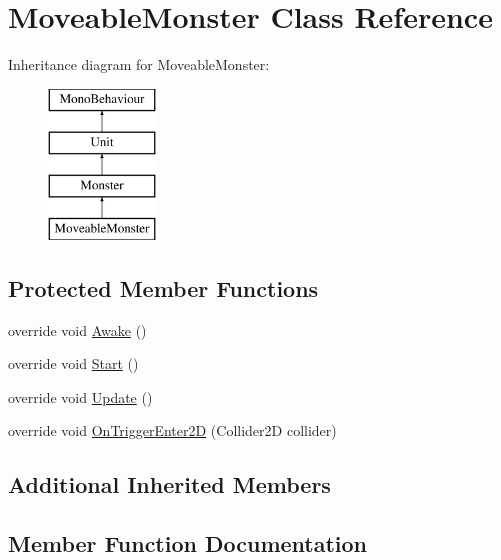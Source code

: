 \hypertarget{class_moveable_monster}{}\section{Moveable\+Monster Class Reference}
\label{class_moveable_monster}
Inheritance diagram for Moveable\+Monster\+:\begin{figure}[H]
\begin{center}
\leavevmode
\includegraphics[height=4.000000cm]{class_moveable_monster}
\end{center}
\end{figure}
\subsection*{Protected Member Functions}
\begin{DoxyCompactItemize}
\item 
override void \mbox{\hyperlink{class_moveable_monster_ae4e3c98d944fa303cf1b2c7f4a05a342}{Awake}} ()
\item 
override void \mbox{\hyperlink{class_moveable_monster_a898a6098d4dd0226084e36f3a1c7f093}{Start}} ()
\item 
override void \mbox{\hyperlink{class_moveable_monster_a03035ace68ce00f475ba1ef194ef5595}{Update}} ()
\item 
override void \mbox{\hyperlink{class_moveable_monster_a07aefb0242f24f5b0f2b4cd820b31522}{On\+Trigger\+Enter2D}} (Collider2D collider)
\end{DoxyCompactItemize}
\subsection*{Additional Inherited Members}


\subsection{Member Function Documentation}
\mbox{\label{class_moveable_monster_ae4e3c98d944fa303cf1b2c7f4a05a342}} 

